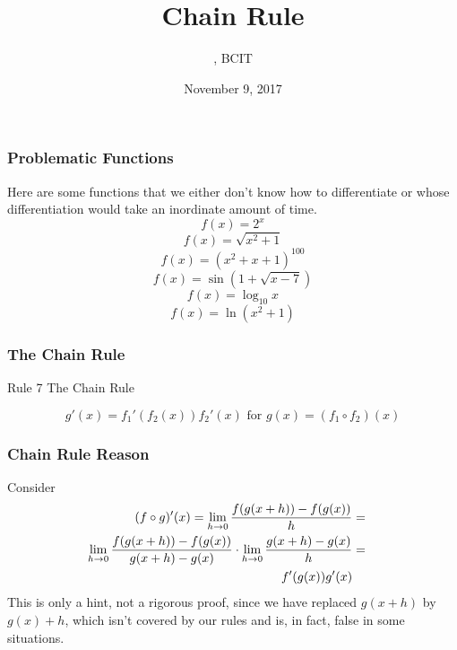 \documentclass[xcolor=dvipsnames]{beamer}
\title{Chain Rule}
\subtitle{{\CourseNumber}, BCIT}
\author{\CourseName}
\date{November 9, 2017}
\begin{document}
\begin{frame}
  \titlepage
\end{frame}

\begin{frame}
  \frametitle{Problematic Functions}
Here are some functions that we either don't know how to differentiate
or whose differentiation would take an inordinate amount of time.
\begin{equation}
  \label{eq:faegeehi}
f(x)=2^{x}
\end{equation}
\begin{equation}
  \label{eq:kooteiju}
f(x)=\sqrt{x^{2}+1}
\end{equation}
\begin{equation}
  \label{eq:oochahph}
f(x)=(x^{2}+x+1)^{100}
\end{equation}
\begin{equation}
  \label{eq:bongaeza}
f(x)=\sin(1+\sqrt{x-7})
\end{equation}
\begin{equation}
  \label{eq:ooquonge}
f(x)=\log_{10}x
\end{equation}
\begin{equation}
  \label{eq:iejafaic}
f(x)=\ln(x^{2}+1)
\end{equation}
\end{frame}

\begin{frame}
  \frametitle{The Chain Rule}
  \begin{block}{Rule 7}
The Chain Rule
  \end{block}
\begin{equation}
  \label{eq:aepuaxai}
g'(x)=f_{1}'(f_{2}(x))f_{2}'(x)\mbox{ for }g(x)=(f_{1}\circ{}f_{2})(x)
\end{equation}
\end{frame}

\begin{frame}
  \frametitle{Chain Rule Reason}
Consider
\begin{align}
  \label{eq:prf}
  (f\circ{}g)'(x)=\lim_{h\rightarrow{}0}\frac{f(g(x+h))-f(g(x))}{h}&=&\notag \\
  \lim_{h\rightarrow{}0}\frac{f(g(x+h))-f(g(x))}{g(x+h)-g(x)}\cdot\lim_{h\rightarrow{}0}\frac{g(x+h)-g(x)}{h}&=& \\
  f'(g(x))g'(x)&&
\end{align}
This is only a hint, not a rigorous proof, since we have replaced
$g(x+h)$ by $g(x)+h$, which isn't covered by our rules and is, in
fact, false in some situations.
\end{frame}
\end{document}
